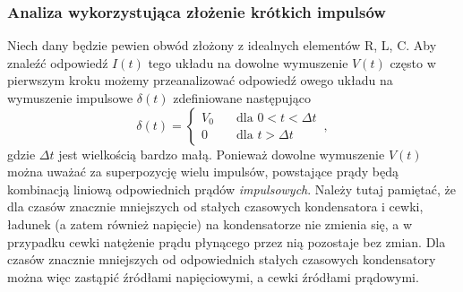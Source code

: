 \documentclass[../main.tex]{subfiles}
\begin{document}
\subsubsection{Analiza wykorzystująca złożenie krótkich impulsów}
Niech dany będzie pewien obwód złożony z idealnych elementów R, L, C. Aby znaleźć odpowiedź \(I(t)\) tego układu na dowolne wymuszenie \(V(t)\) często w pierwszym kroku możemy przeanalizować odpowiedź owego układu na wymuszenie impulsowe \(\delta(t)\) zdefiniowane następująco
\begin{equation*}
    \delta(t)=\begin{cases}V_0&\quad\text{dla \(0<t<\Delta t\)}\\ 0 &\quad\text{dla \(t>\Delta t\)}\end{cases}\,,
\end{equation*}
gdzie \(\Delta t\) jest wielkością bardzo małą. Ponieważ dowolne wymuszenie \(V(t)\) można uważać za superpozycję wielu impulsów, powstające prądy będą kombinacją liniową odpowiednich prądów \textit{impulsowych}. Należy tutaj pamiętać, że dla czasów znacznie mniejszych od stałych czasowych kondensatora i cewki, ładunek (a zatem również napięcie) na kondensatorze nie zmienia się, a w przypadku cewki natężenie prądu płynącego przez nią pozostaje bez zmian. Dla czasów znacznie mniejszych od odpowiednich stałych czasowych kondensatory można więc zastąpić źródłami napięciowymi, a cewki źródłami prądowymi.
\end{document}
